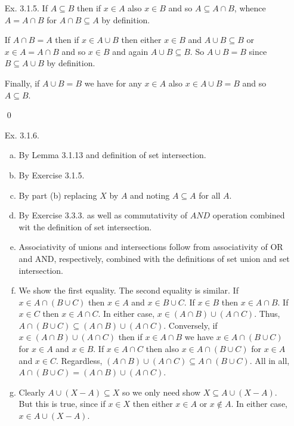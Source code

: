 \begin{enumerate}[Ex. 3.1.1.]
    \qed

    \item[Ex. 3.1.5.] If $A \subseteq B$ then if $x \in A$ also $x \in B$ and so $A \subseteq A\cap B$,
    whence $A = A \cap B$ for $A\cap B\subseteq A$ by definition.

    If $A\cap B = A$ then if $x \in A\cup B$ then either $x \in B$ and $A \cup B \subseteq B$
    or $x \in A = A\cap B$ and so $x \in B$ and again $A\cup B\subseteq B$. So $A\cup B = B$
    since $B \subseteq A\cup B$ by definition.

    Finally, if $A\cup B = B$ we have for any $x \in A$ also $x \in A\cup B = B$ and so
    $A \subseteq B$.

    \qed

    \item[Ex. 3.1.6.] 
    \begin{enumerate}[(a)]
        \item By Lemma 3.1.13 and definition of set intersection.
        \item By Exercise 3.1.5.
        \item By part (b) replacing $X$ by $A$ and noting $A\subseteq A$ for all $A$.
        \item By Exercise 3.3.3. as well as commutativity of $AND$ operation combined wit the
        definition of set intersection.
        \item Associativity of unions and intersections follow from associativity of OR and AND,
        respectively, combined with the definitions of set union and set intersection.
        \item We show the first equality. The second equality is similar. If $x\in A\cap(B\cup C)$
        then $x\in A$ and $x\in B\cup C$. If $x\in B$ then $x\in A\cap B$. If $x\in C$ then
        $x\in A\cap C$. In either case, $x\in (A\cap B)\cup(A\cap C)$. Thus,
        $A\cap(B\cup C) \subseteq (A\cap B)\cup(A\cap C)$. Conversely, if
        $x\in (A\cap B)\cup (A\cap C)$ then if $x\in A\cap B$ we have
        $x\in A\cap(B\cup C)$ for $x\in A$ and $x\in B$. If $x\in A\cap C$ then also
        $x\in A\cap(B\cup C)$ for $x\in A$ and $x\in C$. Regardless, $(A\cap B)\cup(A\cap C)
        \subseteq A\cap(B\cup C)$. All in all, $A\cap(B\cup C) = (A\cap B)\cup(A\cap C)$.
        \item Clearly $A\cup (X-A) \subseteq X$ so we only need show $X\subseteq A \cup (X - A)$.
        But this is true, since if $x\in X$ then either $x\in A$ or $x\not\in A$. In either case,
        $x\in A\cup (X - A)$.


\end{enumerate}
\end{enumerate}
